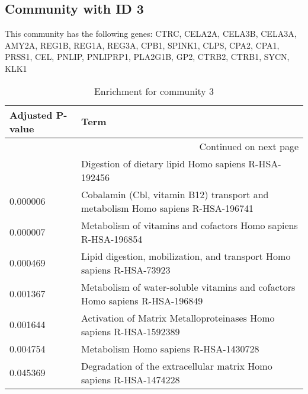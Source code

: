 \subsection*{Community with ID 3}
This community has the following genes: CTRC, CELA2A, CELA3B, CELA3A, AMY2A, REG1B, REG1A, REG3A, CPB1, SPINK1, CLPS, CPA2, CPA1, PRSS1, CEL, PNLIP, PNLIPRP1, PLA2G1B, GP2, CTRB2, CTRB1, SYCN, KLK1
\\
\begin{longtable}{p{2.4cm}p{14.5cm}}
\caption{Enrichment for community 3}\\
\toprule
Adjusted \newline P-value &                                                                             Term \\
\midrule
\endhead
\midrule
\multicolumn{2}{r}{{Continued on next page}} \\
\midrule
\endfoot

\bottomrule
\endlastfoot
                 0.000005 &                             Digestion of dietary lipid Homo sapiens R-HSA-192456 \\
                 0.000006 &  Cobalamin (Cbl, vitamin B12) transport and metabolism Homo sapiens R-HSA-196741 \\
                 0.000007 &                   Metabolism of vitamins and cofactors Homo sapiens R-HSA-196854 \\
                 0.000469 &            Lipid digestion, mobilization, and transport Homo sapiens R-HSA-73923 \\
                 0.001367 &     Metabolism of water-soluble vitamins and cofactors Homo sapiens R-HSA-196849 \\
                 0.001644 &               Activation of Matrix Metalloproteinases Homo sapiens R-HSA-1592389 \\
                 0.004754 &                                            Metabolism Homo sapiens R-HSA-1430728 \\
                 0.045369 &               Degradation of the extracellular matrix Homo sapiens R-HSA-1474228 \\
\end{longtable}


